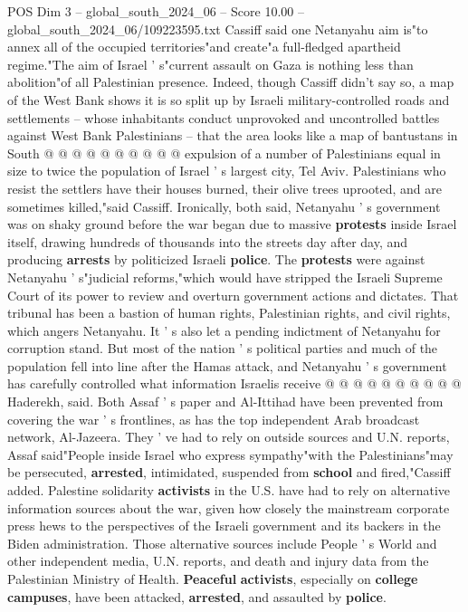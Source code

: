 \begin{textsample}{POS Dim 3 – global\_south\_2024\_06 – Score 10.00 – global\_south\_2024\_06/109223595.txt}
Cassiff said one Netanyahu aim is"to annex all of the occupied territories"and create"a full-fledged apartheid regime."The aim of Israel ' s"current assault on Gaza is nothing less than abolition"of all Palestinian presence.
Indeed, though Cassiff didn't say so, a map of the West Bank shows it is so split up by Israeli military-controlled roads and settlements -- whose inhabitants conduct unprovoked and uncontrolled battles against West Bank Palestinians -- that the area looks like a map of bantustans in South @ @ @ @ @ @ @ @ @ @ expulsion of a number of Palestinians equal in size to twice the population of Israel ' s largest city, Tel Aviv.
Palestinians who resist the settlers have their houses burned, their olive trees uprooted, and are sometimes killed,"said Cassiff.
Ironically, both said, Netanyahu ' s government was on shaky ground before the war began due to massive \textbf{protests} inside Israel itself, drawing hundreds of thousands into the streets day after day, and producing \textbf{arrests} by politicized Israeli \textbf{police}.
The \textbf{protests} were against Netanyahu ' s"judicial reforms,"which would have stripped the Israeli Supreme Court of its power to review and overturn government actions and dictates.
That tribunal has been a bastion of human rights, Palestinian rights, and civil rights, which angers Netanyahu.
It ' s also let a pending indictment of Netanyahu for corruption stand.
But most of the nation ' s political parties and much of the population fell into line after the Hamas attack, and Netanyahu ' s government has carefully controlled what information Israelis receive @ @ @ @ @ @ @ @ @ @ Haderekh, said.
Both Assaf ' s paper and Al-Ittihad have been prevented from covering the war ' s frontlines, as has the top independent Arab broadcast network, Al-Jazeera.
They ' ve had to rely on outside sources and U.N. reports, Assaf said"People inside Israel who express sympathy"with the Palestinians"may be persecuted, \textbf{arrested}, intimidated, suspended from \textbf{school} and fired,"Cassiff added.
Palestine solidarity \textbf{activists} in the U.S. have had to rely on alternative information sources about the war, given how closely the mainstream corporate press hews to the perspectives of the Israeli government and its backers in the Biden administration.
Those alternative sources include People ' s World and other independent media, U.N. reports, and death and injury data from the Palestinian Ministry of Health. \textbf{Peaceful} \textbf{activists}, especially on \textbf{college} \textbf{campuses}, have been attacked, \textbf{arrested}, and assaulted by \textbf{police}.

\end{textsample}
